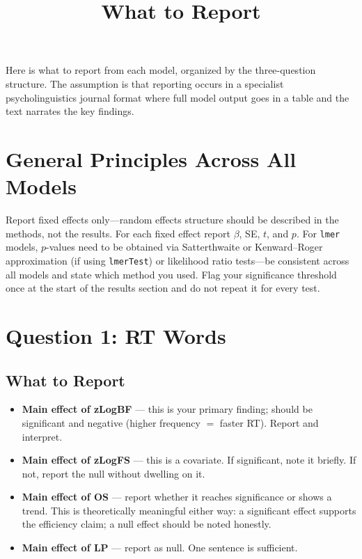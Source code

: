 \documentclass[12pt]{article}
\title{\textbf{What to Report}}
\date{}
\begin{document}
\maketitle

Here is what to report from each model, organized by the three-question structure. The assumption is that reporting occurs in a specialist psycholinguistics journal format where full model output goes in a table and the text narrates the key findings.

\section*{General Principles Across All Models}

Report fixed effects only---random effects structure should be described in the methods, not the results. For each fixed effect report $\beta$, SE, $t$, and $p$. For \texttt{lmer} models, $p$-values need to be obtained via Satterthwaite or Kenward--Roger approximation (if using \texttt{lmerTest}) or likelihood ratio tests---be consistent across all models and state which method you used. Flag your significance threshold once at the start of the results section and do not repeat it for every test.

\section*{Question 1: RT Words}

\subsection*{What to Report}

\begin{itemize}
    \item \textbf{Main effect of zLogBF} --- this is your primary finding; should be significant and negative (higher frequency $=$ faster RT). Report and interpret.
    \item \textbf{Main effect of zLogFS} --- this is a covariate. If significant, note it briefly. If not, report the null without dwelling on it.
    \item \textbf{Main effect of OS} --- report whether it reaches significance or shows a trend. This is theoretically meaningful either way: a significant effect supports the efficiency claim; a null effect should be noted honestly.
    \item \textbf{Main effect of LP} --- report as null. One sentence is sufficient.
\end{itemize}
\end{document}
